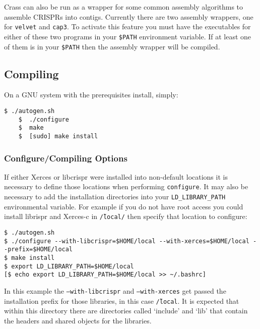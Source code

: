 \documentclass[11pt]{article} %
\begin{document}
Crass can also be run as a wrapper for some common assembly algorithms to assemble CRISPRs into contigs.  Currently there are two assembly wrappers, one for \texttt{velvet} and \texttt{cap3}. To activate this feature you must have the executables for either of these two programs in your \texttt{\$PATH} environment variable.  If at least one of them is in your \texttt{\$PATH} then the assembly wrapper will be compiled.  

\subsection{Compiling}
On a GNU system with the prerequisites install, simply:
\begin{lstlisting}[style=BashInputStyle]
	$ ./autogen.sh
	$  ./configure
	$  make
	$  [sudo] make install
\end{lstlisting}

\subsubsection{Configure/Compiling Options}
\label{sec:configure}
If either Xerces or libcrispr were installed into non-default locations it is necessary to define those locations when performing \lstinline$configure$.  It may also be necessary to add the installation directories into your \lstinline$LD_LIBRARY_PATH$ environmental variable.  For example if you do not have root access you could install librispr and Xerces-c in \texttt{\~/local/} then specify that location to configure: 
\begin{lstlisting}[style=BashInputStyle]
$ ./autogen.sh
$ ./configure --with-libcrispr=$HOME/local --with-xerces=$HOME/local --prefix=$HOME/local
$ make install
$ export LD_LIBRARY_PATH=$HOME/local
[$ echo export LD_LIBRARY_PATH=$HOME/local >> ~/.bashrc] 
\end{lstlisting}

In this example the \texttt{--with-libcrispr} and \texttt{--with-xerces} get passed the installation prefix for those libraries, in this case \texttt{\~/local}.  It is expected that within this directory there are directories called `include' and `lib' that contain the headers and shared objects for the libraries.
\end{document}
